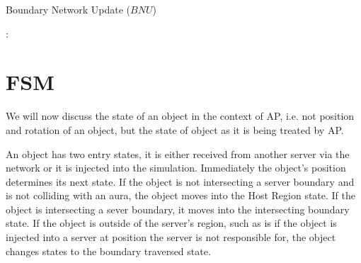 \begin{algorithm}
	\caption{Boundary Network Update ($BNU$)}\label{boundaryNetworkAlgorithm}
	\begin{algorithmic}[1]
		\State {}
		\State {}
		\State
		 :
		\State {}
		\State {}
		\State {}
		\State {}
		\EndFor
		\EndProcedure
	\end{algorithmic}
\end{algorithm}

\section{FSM}
We will now discuss the state of an object in the context of AP, i.e. not position and rotation of an object, but the state of object as it is being treated by AP.

An object has two entry states, it is either received from another server via the network or it is injected into the simulation. Immediately the object's position determines its next state. If the object is not intersecting a server boundary and is not colliding with an aura, the object moves into the Host Region state. If the object is intersecting a sever boundary, it moves into the intersecting boundary state. If the object is outside of the server's region, such as is if the object is injected into a server at position the server is not responsible for, the object changes states to the boundary traversed state.

